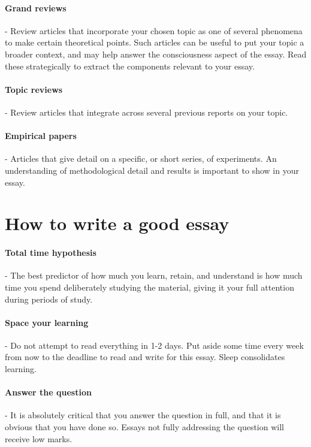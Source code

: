 \documentclass[11pt]{article}
\begin{document}
\paragraph{Grand reviews} - Review articles that incorporate your chosen topic as one of several phenomena to make certain theoretical points. Such articles can be useful to put your topic a broader context, and may help answer the consciousness aspect of the essay. Read these strategically to extract the components relevant to your essay.

\paragraph{Topic reviews} - Review articles that integrate across several previous reports on your topic. 

\paragraph{Empirical papers} - Articles that give detail on a specific, or short series, of experiments. An understanding of methodological detail and results is important to show in your essay. 

\section{How to write a good essay}

\paragraph{Total time hypothesis} - The best predictor of how much you learn, retain, and understand is how much time you spend deliberately studying the material, giving it your full attention during periods of study. 

\paragraph{Space your learning} - Do not attempt to read everything in 1-2 days. Put aside some time every week from now to the deadline to read and write for this essay. Sleep consolidates learning.

\paragraph{Answer the question} - It is absolutely critical that you answer the question in full, and that it is obvious that you have done so. Essays not fully addressing the question will receive low marks. 
\end{document}
